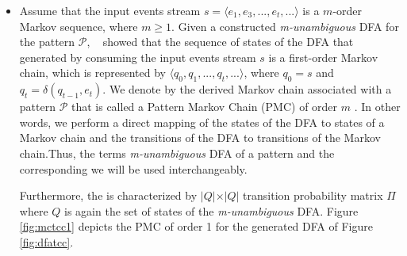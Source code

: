 \begin{itemize}[noitemsep]

\item Assume that the input events stream $s=\langle e_1,e_3,...,e_t,...\rangle$ is a $m$-order Markov sequence, where $m \geq 1$.  Given a constructed \textit{m-unambiguous} DFA for the pattern $\mathcal{P}$, ~\citet{nuel_pattern_2008} showed that the sequence of states of the DFA that generated by consuming the input events stream $s$ is a first-order Markov chain, which is represented by $\langle q_{0},q_{1},...,q_{t},...\rangle$, where $q_{0}=s$ and $q_{t}=\delta(q_{t-1},e_{t})$. We denote by \pmcmr  the derived Markov chain associated with a pattern $\mathcal{P}$ that is called a Pattern Markov Chain (PMC) of order $m$  \cite{nuel_pattern_2008}. In other words, we perform a direct mapping of the states of the DFA to states of a Markov chain and the transitions of the DFA to transitions of the Markov chain.Thus, the terms \textit{m-unambiguous} DFA of a pattern and the corresponding \pmcmr  we will be used interchangeably. 

\par Furthermore, the \pmcmr is characterized by $\vert Q \vert \times \vert Q \vert$ transition probability matrix $\Pi$ where $Q$ is again the set of states of the  \textit{m-unambiguous} DFA. Figure \ref{fig:mctcc1} depicts the PMC of order 1 for the generated DFA of Figure \ref{fig:dfatcc}.

 
\end{itemize}


